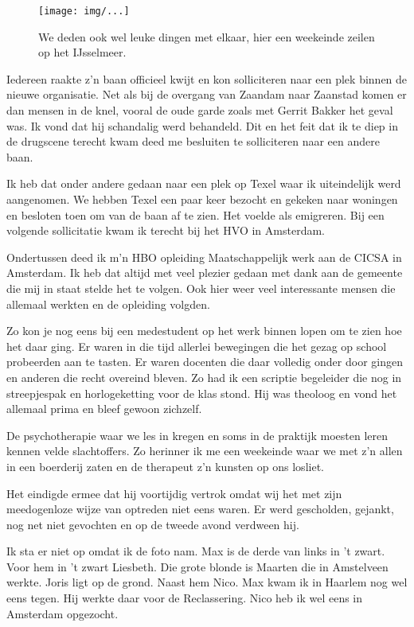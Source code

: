 \documentclass[10pt,twoside,openright]{memoir}
\begin{document}
\begin{figure}[t]
\texttt{[image: img/...]}
\caption{We deden ook wel leuke dingen met elkaar, hier een weekeinde zeilen op het IJsselmeer.}
\end{figure}

Iedereen raakte z’n baan officieel kwijt en kon solliciteren naar een plek binnen de nieuwe organisatie. Net als bij de overgang van Zaandam naar Zaanstad komen er dan mensen in de knel, vooral de oude garde zoals met Gerrit Bakker het geval was. Ik vond dat hij schandalig werd behandeld. Dit en het feit dat ik te diep in de drugscene terecht kwam deed me besluiten te solliciteren naar een andere baan. 

Ik heb dat onder andere gedaan naar een plek op Texel waar ik uiteindelijk werd aangenomen. We hebben Texel een paar keer bezocht en gekeken naar woningen en besloten toen om van de baan af te zien. Het voelde als emigreren. Bij een volgende sollicitatie kwam ik terecht bij het HVO in Amsterdam.

Ondertussen deed ik m’n HBO opleiding Maatschappelijk werk aan de CICSA in Amsterdam. Ik heb dat altijd met veel plezier gedaan met dank aan de gemeente die mij in staat stelde het te volgen. Ook hier weer veel interessante mensen die allemaal werkten en de opleiding volgden. 

Zo kon je nog eens bij een medestudent op het werk binnen lopen om te zien hoe het daar ging. Er waren in die tijd allerlei bewegingen die het gezag op school probeerden aan te tasten. Er waren docenten die daar volledig onder door gingen en anderen die recht overeind bleven. Zo had ik een scriptie begeleider die nog in streepjespak en horlogeketting voor de klas stond. Hij was theoloog en vond het allemaal prima en bleef gewoon zichzelf. 

De psychotherapie waar we les in kregen en soms in de praktijk moesten leren kennen velde slachtoffers. Zo herinner ik me een weekeinde waar we met z’n allen in een boerderij zaten en de therapeut z’n kunsten op ons losliet. 

Het eindigde ermee dat hij voortijdig vertrok omdat wij het met zijn meedogenloze wijze van optreden niet eens waren. Er werd gescholden, gejankt, nog net niet gevochten en op de tweede avond verdween hij.

Ik sta er niet op omdat ik de foto nam. Max is de derde van links in ’t zwart. Voor hem in ’t zwart Liesbeth. Die grote blonde is Maarten die in Amstelveen werkte. Joris ligt op de grond. Naast hem Nico. Max kwam ik in Haarlem nog wel eens tegen. Hij werkte daar voor de Reclassering. Nico heb ik wel eens in Amsterdam opgezocht.
\end{document}
